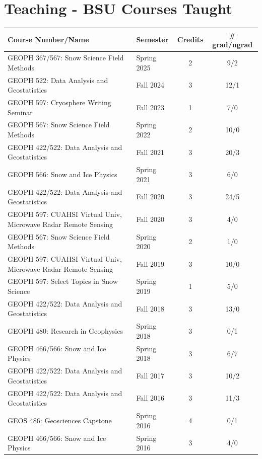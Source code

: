 \documentclass[11pt]{article}
\renewcommand\arraystretch{1}
\begin{document}
\begin{table}[!htbp]
\section*{Teaching - BSU Courses Taught}
\renewcommand\arraystretch{0.7}
  \centering
  \begin{tabular}{|l|l|c|c|}
\hline
\textbf{Course Number/Name} & \textbf{Semester} & \textbf{Credits} & \textbf{\# grad/ugrad} \\ \hline \hline
GEOPH 367/567: Snow Science Field Methods & Spring 2025 & 2 &  9/2 \\ \hline
GEOPH 522: Data Analysis and Geostatistics & Fall 2024 & 3 & 12/1 \\ \hline
GEOPH 597: Cryosphere Writing Seminar & Fall 2023 & 1 & 7/0 \\ \hline
GEOPH 567: Snow Science Field Methods & Spring 2022 & 2 & 10/0 \\ \hline
GEOPH 422/522: Data Analysis and Geostatistics & Fall 2021 & 3 & 20/3 \\ \hline
GEOPH 566: Snow and Ice Physics & Spring 2021 & 3 & 6/0 \\ \hline
GEOPH 422/522: Data Analysis and Geostatistics & Fall 2020 & 3 & 24/5 \\ \hline
GEOPH 597: CUAHSI Virtual Univ, Microwave Radar Remote Sensing & Fall 2020 & 3 & 4/0 \\ \hline
GEOPH 567: Snow Science Field Methods & Spring 2020 & 2 & 1/0 \\ \hline
GEOPH 597: CUAHSI Virtual Univ, Microwave Radar Remote Sensing & Fall 2019 & 3 & 10/0 \\ \hline
GEOPH 597: Select Topics in Snow Science & Spring 2019 & 1 & 5/0 \\ \hline
GEOPH 422/522: Data Analysis and Geostatistics & Fall 2018 & 3 & 13/0 \\ \hline
GEOPH 480: Research in Geophysics & Spring 2018 & 3 & 0/1 \\ \hline
GEOPH 466/566: Snow and Ice Physics & Spring 2018 & 3 & 6/7 \\ \hline
GEOPH 422/522: Data Analysis and Geostatistics & Fall 2017 & 3 & 10/2 \\ \hline
GEOPH 422/522: Data Analysis and Geostatistics & Fall 2016 & 3 & 11/3 \\ \hline
GEOS 486: Geosciences Capstone & Spring 2016 & 4 & 0/1 \\ \hline
GEOPH 466/566: Snow and Ice Physics & Spring 2016 & 3 & 4/0 \\ \hline

\end{tabular}
\end{table}
\end{document}
